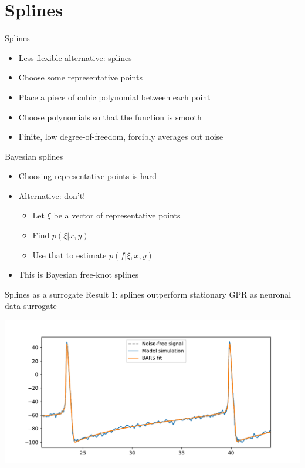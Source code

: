 \documentclass[presentation]{beamer}
\begin{document}
\section{Splines}
\label{sec:orgd0a1eef}
\begin{frame}[<+->][label={sec:org3dd9004}]{Splines}
\begin{itemize}
\item Less flexible alternative: splines
\item Choose some representative points
\item Place a piece of cubic polynomial between each point
\item Choose polynomials so that the function is smooth
\item Finite, low degree-of-freedom, forcibly averages out noise
\end{itemize}
\end{frame}
\begin{frame}[<+->][label={sec:orgfdcbf8e}]{Bayesian splines}
\begin{itemize}
\item Choosing representative points is hard
\item Alternative: don't!
\begin{itemize}
\item Let \(\xi\) be a vector of representative points
\item Find \(p(\xi|x,y)\)
\item Use that to estimate \(p(f | \xi, x, y)\)
\end{itemize}
\item This is Bayesian free-knot splines
\end{itemize}
\end{frame}
\begin{frame}[label={sec:org57131c4}]{Splines as a surrogate}
Result 1: splines outperform stationary GPR as neuronal data surrogate

\begin{center}
\includegraphics[width=.9\linewidth]{./bars.pdf}
\end{center}
\end{frame}
\end{document}
